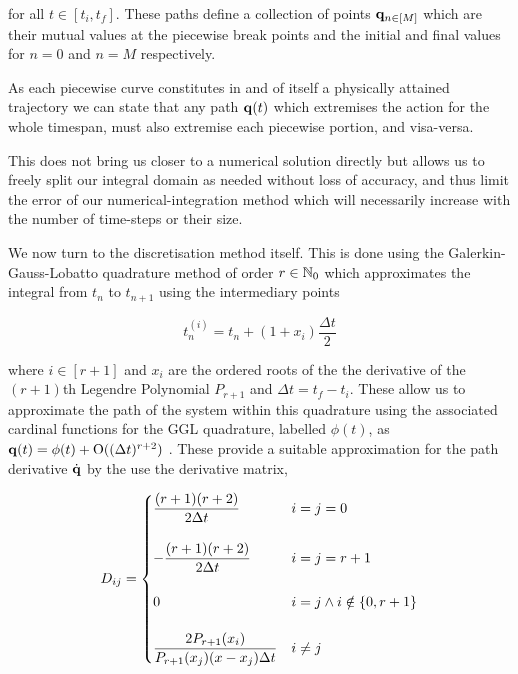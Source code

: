 \documentclass[10pt]{iopart}
\begin{document}
for all $t \in [t_i, t_f]$. These paths define a collection of points $\vb q_{n \in [M]}$ which are their mutual values at the piecewise break points and the initial and final values for $n = 0$ and $n = M$ respectively.

As each piecewise curve constitutes in and of itself a physically attained trajectory we can state that any path $\vb{q}(t)$ which extremises the action for the whole timespan, must also extremise each piecewise portion, and visa-versa. 

This does not bring us closer to a numerical solution directly but allows us to freely split our integral domain as needed without loss of accuracy, and thus limit the error of our numerical-integration method which will necessarily increase with the number of time-steps or their size.

We now turn to the discretisation method itself. This is done using the Galerkin-Gauss-Lobatto quadrature method of order $r \in \mathbb{N}_0$\cite{tsangSLIMPLECTICINTEGRATORSVARIATIONAL2015} which approximates the integral from $t_n$ to $t_{n + 1}$ using the intermediary points

\begin{equation}
  t^{(i)}_n = t_n + (1 + x_i)\frac{\Delta t}{2}
\end{equation}

where $i \in [r + 1]$ and $x_i$ are the ordered roots of the the derivative of the $(r + 1)$th Legendre Polynomial $P_{r + 1}$ and $\Delta t = t_f - t_i$. These allow us to approximate the path of the system within this quadrature using the associated cardinal functions for the GGL quadrature, labelled $\phi(t)$, as \(\vb q(t) = \phi(t) + \mathord{\mathrm{O}}((\Delta t)^{r + 2})\) . These provide a suitable approximation for the path derivative $\dot{\vb q}$ by the use the derivative matrix,

\begin{equation}
  D_{ij} = \begin{cases}
  	\dfrac{(r + 1)(r + 2)}{2\Delta t} &i = j = 0 \\\\
  	-\dfrac{(r + 1)(r + 2)}{2\Delta t} & i = j = r + 1 \\\\
  	0 & i = j \land i \notin \left\{0, r + 1\right\} \\\\
  	\dfrac{2P_{r + 1}(x_i)}{P_{r+1}(x_j)(x - x_j)\Delta t} & i\neq j
  \end{cases}
\end{equation}
\end{document}
